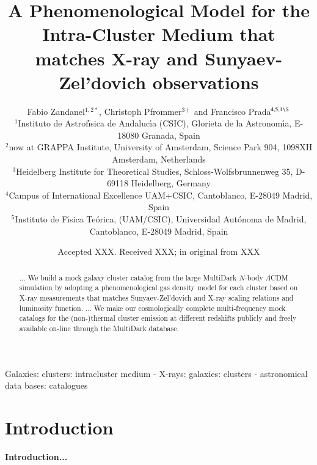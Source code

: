 \documentclass[useAMS,usenatbib]{mn2e}
\title[A Phenomenological Model for the Intra-Cluster Medium]{A Phenomenological Model for the Intra-Cluster Medium that matches X-ray and Sunyaev-Zel'dovich observations}
\author[F. Zandanel, C. Pfrommer and F. Prada]{
Fabio Zandanel$^{1,2 *}$, Christoph Pfrommer$^{3 \dagger}$ and Francisco Prada$^{4,5,1 \S}$\\
$^{1}$Instituto de Astrof\'{\i}sica de Andaluc\'{\i}a (CSIC), Glorieta de la Astronom\'{\i}a, E-18080 Granada, Spain\\
$^{2}$now at GRAPPA Institute, University of Amsterdam, Science Park 904, 1098XH Amsterdam, Netherlands\\
$^{3}$Heidelberg Institute for Theoretical Studies, Schloss-Wolfsbrunnenweg 35, D-69118 Heidelberg, Germany\\
$^{4}$Campus of International Excellence UAM+CSIC, Cantoblanco, E-28049 Madrid, Spain\\
$^{5}$Instituto de F\'{\i}sica Te\'orica, (UAM/CSIC), Universidad Aut\'onoma de Madrid, Cantoblanco, E-28049 Madrid, Spain}
\begin{document}
\date{Accepted XXX. Received XXX; in original from XXX}

\pagerange{\pageref{firstpage}--\pageref{lastpage}} 

\maketitle

\label{firstpage}

\begin{abstract}
  ...
  We build a mock galaxy cluster catalog from the large MultiDark $N$-body $\Lambda$CDM 
  simulation by adopting a phenomenological gas density model for each cluster based on X-ray
  measurements that matches Sunyaev-Zel'dovich and X-ray scaling relations and
  luminosity function. 
  ...
  We make our cosmologically complete multi-frequency mock catalogs for 
  the (non-)thermal cluster emission at different redshifts publicly and freely available on-line
  through the MultiDark database.
\end{abstract}

\begin{keywords}
  Galaxies: clusters: intracluster medium - X-rays: galaxies: clusters - astronomical data bases: catalogues
\end{keywords}



\section{Introduction}
\label{sec:1}

\begingroup
\let\thefootnote\relax{}
\let\thefootnote\relax{}
\let\thefootnote\relax{}
\endgroup

{\bf Introduction...}

%
%
\end{document}
